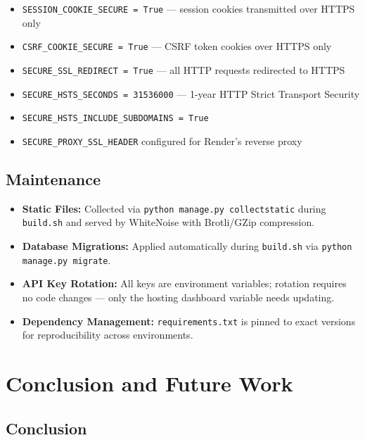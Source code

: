 \documentclass[12pt,a4paper]{article}
\begin{document}
\begin{itemize}
    \item \texttt{SESSION\_COOKIE\_SECURE = True} --- session cookies transmitted over HTTPS only
    \item \texttt{CSRF\_COOKIE\_SECURE = True} --- CSRF token cookies over HTTPS only
    \item \texttt{SECURE\_SSL\_REDIRECT = True} --- all HTTP requests redirected to HTTPS
    \item \texttt{SECURE\_HSTS\_SECONDS = 31536000} --- 1-year HTTP Strict Transport Security
    \item \texttt{SECURE\_HSTS\_INCLUDE\_SUBDOMAINS = True}
    \item \texttt{SECURE\_PROXY\_SSL\_HEADER} configured for Render's reverse proxy
\end{itemize}

\subsection*{Maintenance}

\begin{itemize}
    \item \textbf{Static Files:} Collected via \texttt{python manage.py collectstatic} during \texttt{build.sh} and served by WhiteNoise with Brotli/GZip compression.
    \item \textbf{Database Migrations:} Applied automatically during \texttt{build.sh} via \texttt{python manage.py migrate}.
    \item \textbf{API Key Rotation:} All keys are environment variables; rotation requires no code changes --- only the hosting dashboard variable needs updating.
    \item \textbf{Dependency Management:} \texttt{requirements.txt} is pinned to exact versions for reproducibility across environments.
\end{itemize}

\section{Conclusion and Future Work}

\subsection*{Conclusion}
\end{document}
